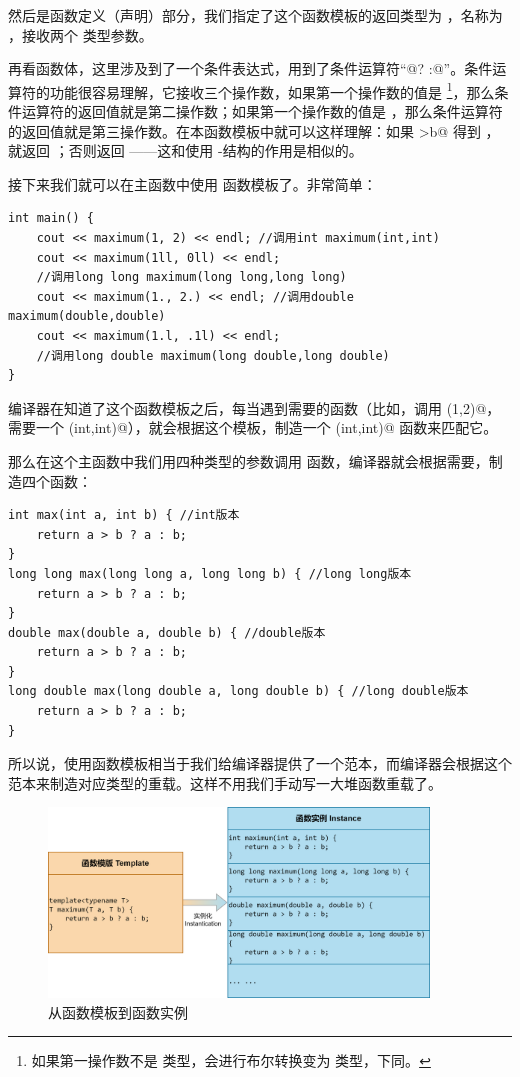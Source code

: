 然后是函数定义（声明）部分，我们指定了这个函数模板的返回类型为 \lstinline@T@，名称为 \lstinline@maximum@，接收两个 \lstinline@T@ 类型参数。\par
再看函数体，这里涉及到了一个条件表达式，用到了条件运算符``@? :@''。条件运算符的功能很容易理解，它接收三个操作数，如果第一个操作数的值是 \lstinline@true@\footnote{如果第一操作数不是 \lstinline@bool@ 类型，会进行布尔转换变为 \lstinline@bool@ 类型，下同。}，那么条件运算符的返回值就是第二操作数；如果第一个操作数的值是 \lstinline@false@，那么条件运算符的返回值就是第三操作数。在本函数模板中就可以这样理解：如果 \lstinline@a>b@ 得到 \lstinline@true@，就返回 \lstinline@a@；否则返回 \lstinline@b@——这和使用 \lstinline@if@-\lstinline@else@ 结构的作用是相似的。\par
接下来我们就可以在主函数中使用 \lstinline@maximum@ 函数模板了。非常简单：
\begin{lstlisting}
int main() {
    cout << maximum(1, 2) << endl; //调用int maximum(int,int)
    cout << maximum(1ll, 0ll) << endl;
    //调用long long maximum(long long,long long)
    cout << maximum(1., 2.) << endl; //调用double maximum(double,double)
    cout << maximum(1.l, .1l) << endl;
    //调用long double maximum(long double,long double)
}
\end{lstlisting}
编译器在知道了这个函数模板之后，每当遇到需要的函数（比如，调用 \lstinline@maximum(1,2)@，需要一个 \lstinline@maximum(int,int)@），就会根据这个模板，制造一个 \lstinline@maximum(int,int)@ 函数来匹配它。\par
那么在这个主函数中我们用四种类型的参数调用 \lstinline@maximum@ 函数，编译器就会根据需要，制造四个函数：
\begin{lstlisting}
int max(int a, int b) { //int版本
    return a > b ? a : b;
}
long long max(long long a, long long b) { //long long版本
    return a > b ? a : b;
}
double max(double a, double b) { //double版本
    return a > b ? a : b;
}
long double max(long double a, long double b) { //long double版本
    return a > b ? a : b;
}
\end{lstlisting}\par
所以说，使用函数模板相当于我们给编译器提供了一个范本，而编译器会根据这个范本来制造对应类型的重载。这样不用我们手动写一大堆函数重载了。\par
\begin{figure}[htbp]
    \centering
    \includegraphics[width=0.9\textwidth]{.//images/generalized_parts/04_function_template_and_instance.drawio.png}
    \caption{从函数模板到函数实例}
\end{figure}
